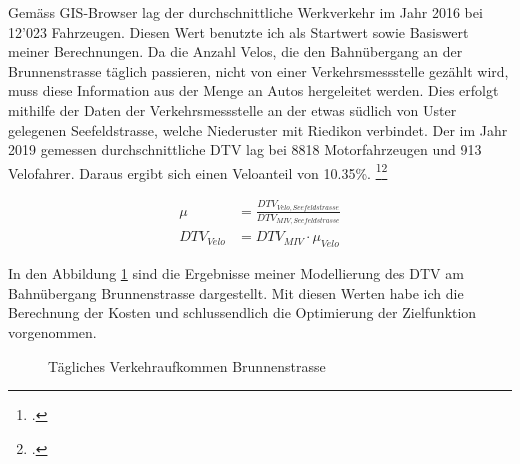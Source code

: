 Gemäss GIS-Browser lag der durchschnittliche Werkverkehr im Jahr 2016 bei 12'023 Fahrzeugen. Diesen Wert benutzte ich als Startwert sowie Basiswert meiner Berechnungen. Da die Anzahl Velos, die den Bahnübergang an der Brunnenstrasse täglich passieren, nicht von einer Verkehrsmessstelle gezählt wird, muss diese Information aus der Menge an Autos hergeleitet werden. Dies erfolgt mithilfe der Daten der Verkehrsmessstelle an der etwas südlich von Uster gelegenen Seefeldstrasse, welche Niederuster mit Riedikon verbindet. 
Der im Jahr 2019 gemessen durchschnittliche DTV lag bei 8818 Motorfahrzeugen und 913 Velofahrer. Daraus ergibt sich einen Veloanteil von 10.35\%. \footcite{MIVSeefeld}\footcite{VeloSeefeld}

\begin{align*}
\mu &= \frac{DTV_{Velo,Seefeldstrasse}}{DTV_{MIV,Seefeldstrasse}}   \\
DTV_{Velo} &= DTV_{MIV} \cdot \mu_{Velo} 
\end{align*}

In den Abbildung \ref{fig:DTV} sind die Ergebnisse meiner Modellierung des DTV am Bahnübergang Brunnenstrasse dargestellt. Mit diesen Werten habe ich die Berechnung der Kosten und schlussendlich die Optimierung der Zielfunktion vorgenommen.

\begin{figure}[h!]
  \centering
  \hfill
\caption[Verkehrsaufkommen]{Tägliches Verkehraufkommen Brunnenstrasse}
  \label{fig:DTV}
\end{figure}

\newpage


